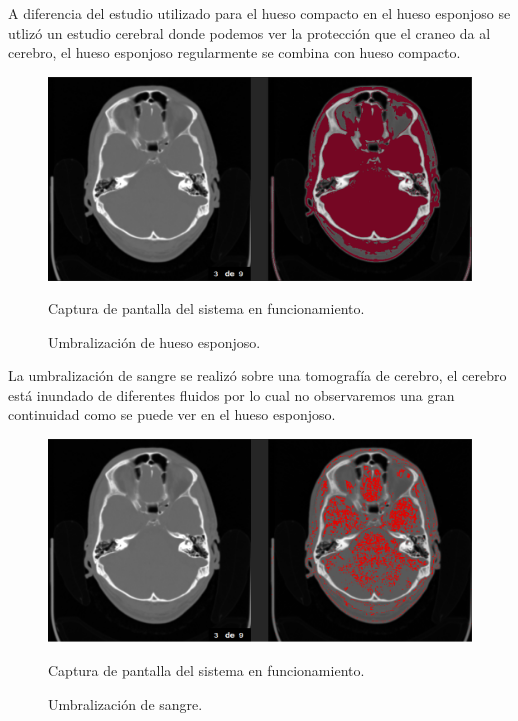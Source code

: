 \documentclass[12pt]{report}
\begin{document}
\newpage
\vspace*{3cm}
A diferencia del estudio utilizado para el hueso compacto en el hueso esponjoso se utlizó un estudio cerebral donde podemos ver la protección que el craneo da al cerebro, el hueso esponjoso regularmente se combina con hueso compacto.
\begin{figure}[H]
\centering
\includegraphics[width = 15 cm, height = 8 cm]{umbralHuesoEsponjoso}
\caption{Umbralización de hueso esponjoso.}
Captura de pantalla del sistema en funcionamiento.
\end{figure}

\newpage
\vspace*{3cm}
La umbralización de sangre se realizó sobre una tomografía de cerebro, el cerebro está inundado de diferentes fluidos por lo cual no observaremos una gran continuidad como se puede ver en el hueso esponjoso.
\begin{figure}[H]
\centering
\includegraphics[width = 15 cm, height = 8 cm]{umbralSangre}
\caption{Umbralización de sangre.}
Captura de pantalla del sistema en funcionamiento.
\end{figure}
\end{document}
